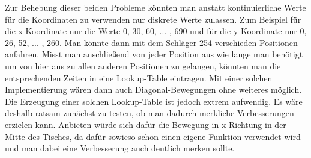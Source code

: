 Zur Behebung dieser beiden Probleme könnten man anstatt kontinuierliche Werte für die Koordinaten zu verwenden nur diskrete Werte zulassen. Zum Beispiel für die x-Koordinate nur die Werte 0, 30, 60, ... , 690 und für die y-Koordinate nur 0, 26, 52, ... , 260. Man könnte dann mit dem Schläger 254 verschieden Positionen anfahren. Misst man anschließend von jeder Position aus wie lange man benötigt um von hier aus zu allen anderen Positionen zu gelangen, könnten man die entsprechenden Zeiten in eine Lookup-Table eintragen. Mit einer solchen Implementierung wären dann auch Diagonal-Bewegungen ohne weiteres möglich. Die Erzeugung einer solchen Lookup-Table ist jedoch extrem aufwendig. Es wäre deshalb ratsam zunächst zu testen, ob man dadurch merkliche Verbesserungen erzielen kann. Anbieten würde sich dafür die Bewegung in x-Richtung in der Mitte des Tisches, da dafür sowieso schon einen eigene Funktion verwendet wird und man dabei eine Verbesserung auch deutlich merken sollte. 